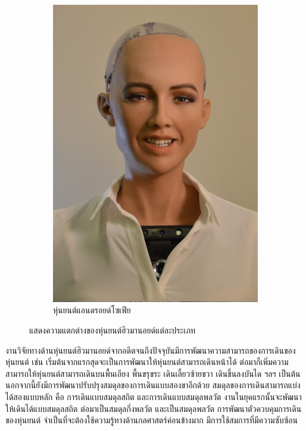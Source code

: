 \begin{figure}[!ht]
\begin{subfigure}[b]{0.3\textwidth}
        \includegraphics[width=\textwidth]{chapter2/images/โซเฟีย.jpg}
        \caption{หุ่นยนต์แอนดรอยด์โซเฟีย}
        \label{fig:sophia}
    \end{subfigure}
    \caption{แสดงความแตกต่างของหุ่นยนต์ฮิวมานอยด์แต่ละประเภท}
    \label{fig:diff_humanoid}
\end{figure}

งานวิจัยทางด้านหุ่นยนต์ฮิวมานอยด์จากอดีตจนถึงปัจจุบันมีการพัฒนาความสามารถของการเดินของหุ่นยนต์
เช่น เริ่มต้นจากแรกสุดจะเป็นการพัฒนาให้หุ่นยนต์สามารถเดินหน้าได้ ต่อมาก็เพิ่มความสามารถให้หุ่นยนต์สามารถเดินบนพื้นเอียง พื้นขรุขระ
เดินเลี้ยวซ้ายขวา เดินขึ้นลงบันได ฯลฯ เป็นต้น นอกจากนี้ยังมีการพัฒนาปรับปรุงสมดุลของการเดินแบบสองขาอีกด้วย สมดุลของการเดินสามารถแบ่งได้สองแบบหลัก
คือ การเดินแบบสมดุลสถิต และการเดินแบบสมดุลพลวัต งานในยุคแรกนั้นจะพัฒนาให้เดินได้แบบสมดุลสถิต ต่อมาเป็นสมดุลกึ่งพลวัต
และเป็นสมดุลพลวัต การพัฒนาตัวควบคุมการเดินของหุ่นยนต์ จำเป็นที่จะต้องใช้ความรู้ทางด้านกลศาสตร์ค่อนข้างมาก มีการใช้สมการที่มีความซับซ้อน

